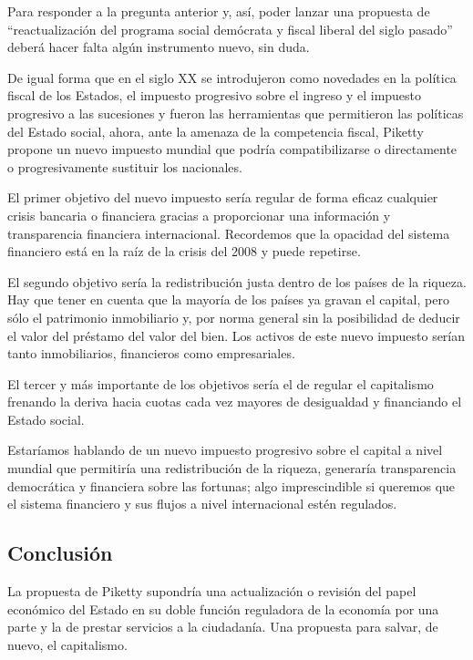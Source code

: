\documentclass[
]{article}
\begin{document}
Para responder a la pregunta anterior y, así, poder lanzar una propuesta
de ``reactualización del programa social demócrata y fiscal liberal del
siglo pasado'' deberá hacer falta algún instrumento nuevo, sin duda.

De igual forma que en el siglo XX se introdujeron como novedades en la
política fiscal de los Estados, el impuesto progresivo sobre el ingreso
y el impuesto progresivo a las sucesiones y fueron las herramientas que
permitieron las políticas del Estado social, ahora, ante la amenaza de
la competencia fiscal, Piketty propone un nuevo impuesto mundial que
podría compatibilizarse o directamente o progresivamente sustituir los
nacionales.

El primer objetivo del nuevo impuesto sería regular de forma eficaz
cualquier crisis bancaria o financiera gracias a proporcionar una
información y transparencia financiera internacional. Recordemos que la
opacidad del sistema financiero está en la raíz de la crisis del 2008 y
puede repetirse.

El segundo objetivo sería la redistribución justa dentro de los países
de la riqueza. Hay que tener en cuenta que la mayoría de los países ya
gravan el capital, pero sólo el patrimonio inmobiliario y, por norma
general sin la posibilidad de deducir el valor del préstamo del valor
del bien. Los activos de este nuevo impuesto serían tanto inmobiliarios,
financieros como empresariales.

El tercer y más importante de los objetivos sería el de regular el
capitalismo frenando la deriva hacia cuotas cada vez mayores de
desigualdad y financiando el Estado social.

Estaríamos hablando de un nuevo impuesto progresivo sobre el capital a
nivel mundial que permitiría una redistribución de la riqueza, generaría
transparencia democrática y financiera sobre las fortunas; algo
imprescindible si queremos que el sistema financiero y sus flujos a
nivel internacional estén regulados.

\hypertarget{conclusiuxf3n}{%
\subsection{Conclusión}\label{conclusiuxf3n}}

La propuesta de Piketty supondría una actualización o revisión del papel
económico del Estado en su doble función reguladora de la economía por
una parte y la de prestar servicios a la ciudadanía. Una propuesta para
salvar, de nuevo, el capitalismo.
\end{document}
